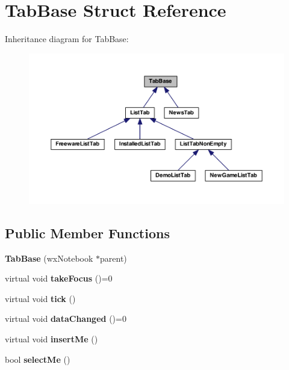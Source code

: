 \hypertarget{struct_tab_base}{\section{Tab\-Base Struct Reference}
\label{struct_tab_base}
}


Inheritance diagram for Tab\-Base\-:
\nopagebreak
\begin{figure}[H]
\begin{center}
\leavevmode
\includegraphics[width=350pt]{struct_tab_base__inherit__graph}
\end{center}
\end{figure}
\subsection*{Public Member Functions}
\begin{DoxyCompactItemize}
\item 
\hypertarget{struct_tab_base_af426aaeb43b31c090cbc30c5dd692c1b}{{\bfseries Tab\-Base} (wx\-Notebook $\ast$parent)}\label{struct_tab_base_af426aaeb43b31c090cbc30c5dd692c1b}

\item 
\hypertarget{struct_tab_base_ab3e91bf9e981c736d15800324ac22dbb}{virtual void {\bfseries take\-Focus} ()=0}\label{struct_tab_base_ab3e91bf9e981c736d15800324ac22dbb}

\item 
\hypertarget{struct_tab_base_ab9384b404604ca14a9a5e105410b4a1d}{virtual void {\bfseries tick} ()}\label{struct_tab_base_ab9384b404604ca14a9a5e105410b4a1d}

\item 
\hypertarget{struct_tab_base_a612044dd2c5cf7a1dd81fb6e3a4779f0}{virtual void {\bfseries data\-Changed} ()=0}\label{struct_tab_base_a612044dd2c5cf7a1dd81fb6e3a4779f0}

\item 
\hypertarget{struct_tab_base_a7369a5f3cbe3fe6a9d2185ceb0ed26fe}{virtual void {\bfseries insert\-Me} ()}\label{struct_tab_base_a7369a5f3cbe3fe6a9d2185ceb0ed26fe}

\item 
\hypertarget{struct_tab_base_acc8a88abc1a420c704c8bc5143c4c8bd}{bool {\bfseries select\-Me} ()}\label{struct_tab_base_acc8a88abc1a420c704c8bc5143c4c8bd}

\end{DoxyCompactItemize}
